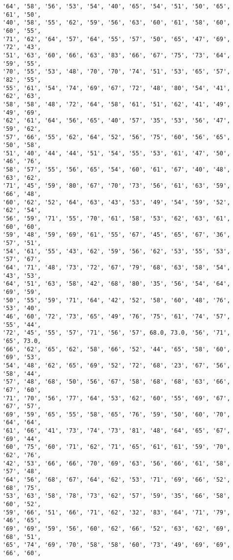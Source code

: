 \documentclass[11pt]{article}
\begin{document}
\begin{Verbatim}[commandchars=\\\{\}]
'64', '58', '56', '53', '54', '40', '65', '54', '51', '50', '65', '61', '50',
'40', '58', '55', '62', '59', '56', '63', '60', '61', '58', '60', '60', '55',
'71', '62', '64', '57', '64', '55', '57', '50', '65', '47', '69', '72', '43',
'51', '63', '60', '66', '63', '83', '66', '67', '75', '73', '64', '59', '55',
'70', '55', '53', '48', '70', '70', '74', '51', '53', '65', '57', '82', '55',
'55', '61', '54', '74', '69', '67', '72', '48', '80', '54', '41', '62', '63',
'58', '58', '48', '72', '64', '58', '61', '51', '62', '41', '49', '49', '69',
'62', '61', '64', '56', '65', '40', '57', '35', '53', '56', '47', '59', '62',
'57', '66', '55', '62', '64', '52', '56', '75', '60', '56', '65', '50', '58',
'51', '40', '44', '44', '51', '54', '55', '53', '61', '47', '50', '46', '76',
'58', '57', '55', '56', '65', '54', '60', '61', '67', '40', '48', '63', '62',
'71', '45', '59', '80', '67', '70', '73', '56', '61', '63', '59', '66', '48',
'60', '62', '52', '64', '63', '43', '53', '49', '54', '59', '52', '62', '54',
'56', '59', '71', '55', '70', '61', '58', '53', '62', '63', '61', '60', '60',
'59', '48', '59', '69', '61', '55', '67', '45', '65', '67', '36', '57', '51',
'54', '61', '55', '43', '62', '59', '56', '62', '53', '55', '53', '57', '67',
'64', '71', '48', '73', '72', '67', '79', '68', '63', '58', '54', '43', '53',
'64', '51', '63', '58', '42', '68', '80', '35', '56', '54', '64', '69', '59',
'50', '55', '59', '71', '64', '42', '52', '58', '60', '48', '76', '53', '40',
'46', '60', '72', '73', '65', '49', '76', '75', '61', '74', '57', '55', '44',
'72', '45', '55', '57', '71', '56', '57', 68.0, 73.0, '56', '71', '65', 73.0,
'66', '62', '65', '62', '58', '66', '52', '44', '65', '58', '60', '69', '53',
'54', '48', '62', '65', '69', '52', '72', '68', '23', '67', '56', '58', '44',
'57', '48', '68', '50', '56', '67', '58', '68', '68', '63', '66', '67', '60',
'71', '70', '56', '77', '64', '53', '62', '60', '55', '69', '67', '67', '57',
'69', '59', '65', '55', '58', '65', '76', '59', '50', '60', '70', '64', '64',
'61', '66', '41', '73', '74', '73', '81', '48', '64', '65', '67', '69', '44',
'60', '75', '60', '71', '62', '71', '65', '61', '61', '59', '70', '62', '76',
'42', '53', '66', '66', '70', '69', '63', '56', '66', '61', '58', '57', '48',
'64', '56', '68', '67', '64', '62', '53', '71', '69', '66', '52', '68', '75',
'53', '63', '58', '78', '73', '62', '57', '59', '35', '66', '58', '60', '52',
'59', '66', '51', '66', '71', '62', '32', '83', '64', '71', '79', '46', '65',
'69', '69', '59', '56', '60', '62', '66', '52', '63', '62', '69', '68', '51',
'65', '74', '69', '70', '58', '58', '60', '73', '49', '69', '69', '66', '60',

\end{Verbatim}
\end{document}
